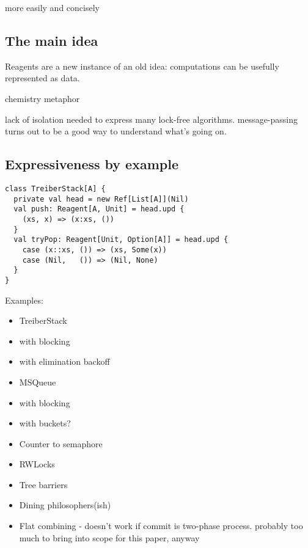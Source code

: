 \documentclass[preprint]{sigplanconf}
\begin{document}
more easily and concisely

\subsection{The main idea}

Reagents are a new instance of an old idea: computations can be usefully
represented as data.




 
chemistry metaphor

lack of isolation needed to express many lock-free algorithms.
message-passing turns out to be a good way to understand what's going on.

\subsection{Expressiveness by example}

\begin{lstlisting}
class TreiberStack[A] {
  private val head = new Ref[List[A]](Nil)
  val push: Reagent[A, Unit] = head.upd {
    (xs, x) => (x:xs, ())
  }
  val tryPop: Reagent[Unit, Option[A]] = head.upd {
    case (x::xs, ()) => (xs, Some(x))
    case (Nil,   ()) => (Nil, None)
  }
}
\end{lstlisting}

Examples:

\begin{itemize}
\item TreiberStack
\item with blocking
\item with elimination backoff
\item MSQueue
\item with blocking
\item with buckets?
\item Counter to semaphore
\item RWLocks
\item Tree barriers
\item Dining philosophers(ish)
\item Flat combining - doesn't work if commit is two-phase process.
  probably too much to bring into scope for this paper, anyway
\end{itemize}
\end{document}
